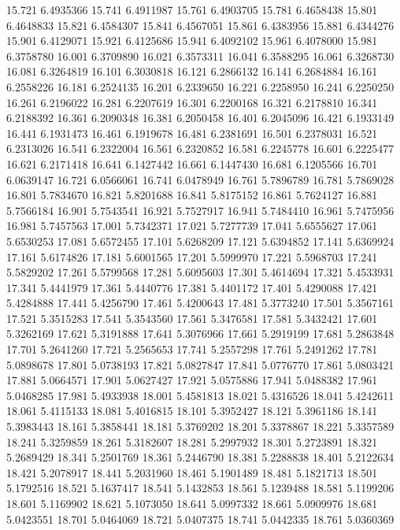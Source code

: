 15.721 6.4935366
15.741 6.4911987
15.761 6.4903705
15.781 6.4658438
15.801 6.4648833
15.821 6.4584307
15.841 6.4567051
15.861 6.4383956
15.881 6.4344276
15.901 6.4129071
15.921 6.4125686
15.941 6.4092102
15.961 6.4078000
15.981 6.3758780
16.001 6.3709890
16.021 6.3573311
16.041 6.3588295
16.061 6.3268730
16.081 6.3264819
16.101 6.3030818
16.121 6.2866132
16.141 6.2684884
16.161 6.2558226
16.181 6.2524135
16.201 6.2339650
16.221 6.2258950
16.241 6.2250250
16.261 6.2196022
16.281 6.2207619
16.301 6.2200168
16.321 6.2178810
16.341 6.2188392
16.361 6.2090348
16.381 6.2050458
16.401 6.2045096
16.421 6.1933149
16.441 6.1931473
16.461 6.1919678
16.481 6.2381691
16.501 6.2378031
16.521 6.2313026
16.541 6.2322004
16.561 6.2320852
16.581 6.2245778
16.601 6.2225477
16.621 6.2171418
16.641 6.1427442
16.661 6.1447430
16.681 6.1205566
16.701 6.0639147
16.721 6.0566061
16.741 6.0478949
16.761 5.7896789
16.781 5.7869028
16.801 5.7834670
16.821 5.8201688
16.841 5.8175152
16.861 5.7624127
16.881 5.7566184
16.901 5.7543541
16.921 5.7527917
16.941 5.7484410
16.961 5.7475956
16.981 5.7457563
17.001 5.7342371
17.021 5.7277739
17.041 5.6555627
17.061 5.6530253
17.081 5.6572455
17.101 5.6268209
17.121 5.6394852
17.141 5.6369924
17.161 5.6174826
17.181 5.6001565
17.201 5.5999970
17.221 5.5968703
17.241 5.5829202
17.261 5.5799568
17.281 5.6095603
17.301 5.4614694
17.321 5.4533931
17.341 5.4441979
17.361 5.4440776
17.381 5.4401172
17.401 5.4290088
17.421 5.4284888
17.441 5.4256790
17.461 5.4200643
17.481 5.3773240
17.501 5.3567161
17.521 5.3515283
17.541 5.3543560
17.561 5.3476581
17.581 5.3432421
17.601 5.3262169
17.621 5.3191888
17.641 5.3076966
17.661 5.2919199
17.681 5.2863848
17.701 5.2641260
17.721 5.2565653
17.741 5.2557298
17.761 5.2491262
17.781 5.0898678
17.801 5.0738193
17.821 5.0827847
17.841 5.0776770
17.861 5.0803421
17.881 5.0664571
17.901 5.0627427
17.921 5.0575886
17.941 5.0488382
17.961 5.0468285
17.981 5.4933938
18.001 5.4581813
18.021 5.4316526
18.041 5.4242611
18.061 5.4115133
18.081 5.4016815
18.101 5.3952427
18.121 5.3961186
18.141 5.3983443
18.161 5.3858441
18.181 5.3769202
18.201 5.3378867
18.221 5.3357589
18.241 5.3259859
18.261 5.3182607
18.281 5.2997932
18.301 5.2723891
18.321 5.2689429
18.341 5.2501769
18.361 5.2446790
18.381 5.2288838
18.401 5.2122634
18.421 5.2078917
18.441 5.2031960
18.461 5.1901489
18.481 5.1821713
18.501 5.1792516
18.521 5.1637417
18.541 5.1432853
18.561 5.1239488
18.581 5.1199206
18.601 5.1169902
18.621 5.1073050
18.641 5.0997332
18.661 5.0909976
18.681 5.0423551
18.701 5.0464069
18.721 5.0407375
18.741 5.0442335
18.761 5.0360369
